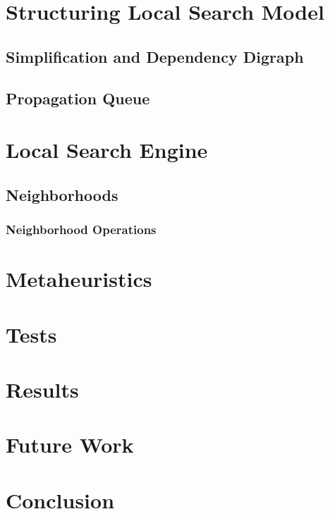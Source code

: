 \documentclass[a4paper,12pt]{article}
\begin{document}
\section{Structuring Local Search Model}

  \subsection{Simplification and Dependency Digraph}
     \label{sec_ddg}
  \subsection{Propagation Queue}  
    \label{sec_propaqueue}
    
  
  
\section{Local Search Engine} \label{sec_local}
  \subsection{Neighborhoods}
    \subsubsection{Neighborhood Operations}
\section{Metaheuristics}
\section{Tests}
\section{Results}
\section{Future Work}
  
\section{Conclusion}
\end{document}
